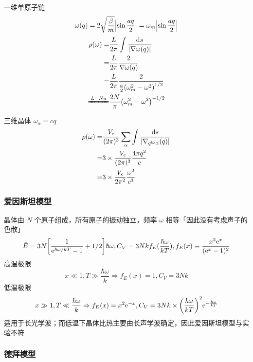 \begin{framed}
    \begin{multicols}{2}
        一维单原子链
        \[ \omega(q) = 2 \sqrt{\frac{\beta}{m}} \qty|\sin \frac{a q}{2}| = \omega_m \qty|\sin \frac{a q}{2}| \]
        \begin{align*}
            \rho(\omega) =       & \frac{L}{2 \pi} \int \frac{\dd s}{\qty|\nabla \omega(q)|}               \\
            =                    & \frac{L}{2 \pi} \frac{2}{\nabla \omega(q)}                              \\
            =                    & \frac{L}{2 \pi} \frac{2}{\frac{a}{2} \qty(\omega_m^2 - \omega^2)^{1/2}} \\
            \xlongequal{L = N a} & \frac{2 N}{\pi} \qty(\omega_m^2 - \omega^2)^{-1/2}
        \end{align*}

        三维晶体 $\omega_\alpha = c q$
        \begin{align*}
            \rho(\omega) = & \frac{V_c}{(2 \pi)^3} \sum_{\alpha} \int \frac{\dd s}{\qty|\nabla_q \omega_{\alpha}(q)|} \\
            =              & 3 \times \frac{V_c}{(2 \pi)^3} \frac{4 \pi q^2}{c}                                       \\
            =              & 3 \times \frac{V_c}{2 \pi^2} \frac{\omega^2}{c^3}
        \end{align*}
    \end{multicols}
\end{framed}

\subsubsection{爱因斯坦模型}

晶体由 $N$ 个原子组成，所有原子的振动独立，频率 $\omega$ 相等「因此没有考虑声子的色散」
\[ \bar{E} = 3 N \qty[\frac{1}{\mathrm{e}^{\hbar \omega / k T} - 1} + 1/2] \hbar \omega, C_V = 3 N k f_E(\frac{\hbar \omega}{k T}), f_E(x) \equiv \frac{x^2 \mathrm{e}^x}{(\mathrm{e}^x - 1)^2} \]
高温极限
\[ x \ll 1, T \gg \frac{\hbar \omega}{k} \Rightarrow f_E(x) = 1, C_V = 3 N k \]
低温极限
\[ x \gg 1, T \ll \frac{\hbar \omega}{k} \Rightarrow f_E(x) = x^2 \mathrm{e}^{- x}, C_V = 3 N k \times \qty(\frac{\hbar \omega}{k T})^2 \mathrm{e}^{- \frac{\hbar \omega}{k T}} \]
适用于长光学波；而低温下晶体比热主要由长声学波确定，因此爱因斯坦模型与实验不符

\subsubsection{德拜模型}

